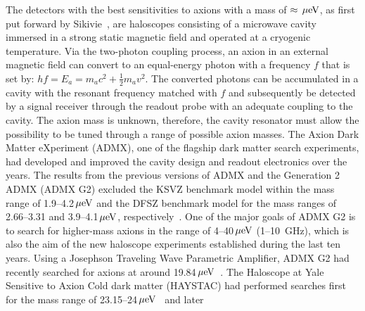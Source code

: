 \documentclass[%
reprint, %
superscriptaddress,
 amsmath,amssymb,
 aps
]{revtex4-2}
\begin{document}
The detectors with the best sensitivities to axions with a mass of 
$\approx \,\mu\text{e\hspace{-.08em}V}$, as first put forward by 
Sikivie~\cite{SikivieI,SikivieII}, are haloscopes consisting of a microwave 
cavity immersed in a strong static magnetic field and operated at a cryogenic 
temperature. 
Via the two-photon coupling process, an axion in an external magnetic field 
can convert to an equal-energy photon with a frequency $f$ that is set by: 
$hf=E_a=m_a c^2 + \frac{1}{2}m_a v^2$. The converted photons can be 
accumulated in a cavity with the resonant frequency matched with $f$ and 
subsequently be detected by a signal receiver through the readout probe with 
an adequate coupling to the cavity. 
The axion mass is unknown, therefore, the cavity resonator must allow the 
possibility to be tuned through a range of possible axion masses. The Axion 
Dark Matter eXperiment (ADMX), one of the flagship dark matter search 
experiments, had developed and improved the cavity design and readout 
electronics over the years. The results from the previous 
versions of ADMX and the Generation 2 ADMX (ADMX G2) excluded the KSVZ 
benchmark model within the mass range of 
1.9--4.2$\,\mu\text{e\hspace{-.08em}V}$ and the DFSZ benchmark model for the 
mass ranges of 2.66--3.31 and 3.9--4.1$\,\mu\text{e\hspace{-.08em}V}$, 
respectively~\cite{ADMXI,ADMXII,ADMXIII,ADMXIV,ADMXV,ADMXVI,ADMXVII}. 
One of the major goals of ADMX G2 is to search for higher-mass axions in the 
range of 4--40$\,\mu\text{e\hspace{-.08em}V}$ (1--10~GHz), which is also the 
aim of the new haloscope experiments established during the last ten years. 
Using a Josephson Traveling Wave Parametric Amplifier, ADMX G2 had recently 
searched for axions at around 
19.84$\,\mu\text{e\hspace{-.08em}V}$~\cite{ADMXUnPub}. 
The Haloscope at Yale Sensitive to Axion Cold dark matter 
(HAYSTAC) had performed searches first for the mass range of 
23.15--24$\,\mu\text{e\hspace{-.08em}V}$~\cite{HAYSTACIII,HAYSTACIV} and later 
\end{document}

